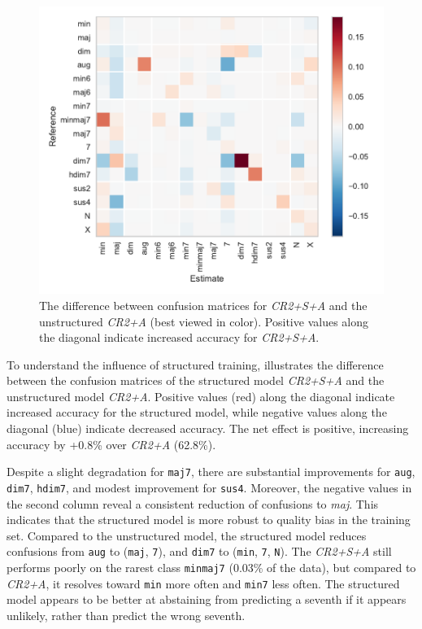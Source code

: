 \documentclass{article}
\begin{document}
\begin{figure}
    \centering
    \includegraphics[width=\columnwidth]{confdelta}
    \caption{The difference between confusion matrices for \emph{CR2+S+A} and the unstructured \emph{CR2+A} (best viewed in color).
    Positive values along the diagonal indicate increased accuracy for \emph{CR2+S+A}.\label{fig:confdelta}}
\end{figure}

To understand the influence of structured training,  illustrates the difference between the confusion matrices of the structured model \emph{CR2+S+A} and the unstructured model \emph{CR2+A}.
Positive values (red) along the diagonal indicate increased accuracy for the structured model, while negative values along the diagonal (blue) indicate decreased accuracy.
The net effect is positive, increasing accuracy by +0.8\% over \emph{CR2+A} (62.8\%).

Despite a slight degradation for \texttt{maj7}, there are substantial improvements for \texttt{aug}, \texttt{dim7}, \texttt{hdim7}, and modest improvement for \texttt{sus4}.
Moreover, the negative values in the second column reveal a consistent reduction of confusions to \emph{maj}.
This indicates that the structured model is more robust to quality bias in the training set.
Compared to the unstructured model, the structured model reduces confusions from \texttt{aug} to (\texttt{maj}, \texttt{7}), and \texttt{dim7} to (\texttt{min}, \texttt{7}, \texttt{N}).
The \emph{CR2+S+A} still performs poorly on the rarest class \texttt{minmaj7} (0.03\% of the data), but compared to \emph{CR2+A}, it resolves toward \texttt{min} more often and \texttt{min7} less often.
The structured model appears to be better at abstaining from predicting a seventh if it appears unlikely, rather than predict the wrong seventh.
\end{document}
